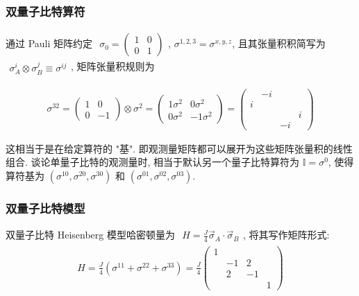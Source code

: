 \documentclass[../../main.tex]{subfiles}
\begin{document}
\subsubsection{双量子比特算符}

通过 Pauli 矩阵约定 $\begin{aligned}
    \sigma_{0} = \begin{pmatrix}
        1 & 0 \\ 0 & 1
    \end{pmatrix}
\end{aligned}$, $\sigma^{1,2,3}=\sigma^{x,y,z}$, 且其张量积积简写为 $\begin{aligned}
    \sigma_{A}^{i}\otimes\sigma_{B}^{j}\equiv \sigma^{ij}
\end{aligned}$, 矩阵张量积规则为

\begin{align*}
    \sigma^{32} = \begin{pmatrix}
        1 & 0 \\ 0 & -1
    \end{pmatrix}\otimes \sigma^{2} = \begin{pmatrix}
1\sigma^{2} & 0\sigma^{2} \\ 0\sigma^{2} & -1\sigma^{2}
    \end{pmatrix} = \begin{pmatrix}
        & -i & & \\
        i &  &  & \\
        &  &  & i \\
        &  & -i &
    \end{pmatrix}
\end{align*}

这相当于是在给定算符的 "基". 即观测量矩阵都可以展开为这些矩阵张量积的线性组合. 谈论单量子比特的观测量时, 相当于默认另一个量子比特算符为 $\mathbb{I} = \sigma^{0}$, 使得算符基为 $(\sigma^{10},\sigma^{20},\sigma^{30})$ 和 $(\sigma^{01},\sigma^{02},\sigma^{03})$.

\subsubsection{双量子比特模型}

双量子比特 Heisenberg 模型哈密顿量为 $\begin{aligned}
    H = \frac{J}{4}\vec{\sigma}_{A}\cdot\vec{\sigma}_{B}
\end{aligned}$, 将其写作矩阵形式:
\begin{align*}
    H = \frac{J}{4}(\sigma^{11}+\sigma^{22}+\sigma^{33}) = \frac{J}{4} \begin{pmatrix}
        1 &  & & \\
         & -1 & 2 & \\
         & 2 & -1 & \\
            &  &  & 1
    \end{pmatrix}
\end{align*}
\end{document}
